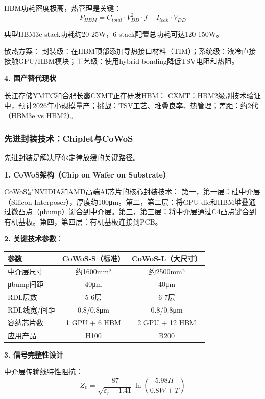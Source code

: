 HBM功耗密度极高，热管理是关键：
\begin{equation}
P_{HBM} = C_{total} \cdot V_{DD}^2 \cdot f + I_{leak} \cdot V_{DD}
\end{equation}

典型HBM3e stack功耗约20-25W，6-stack配置总功耗可达120-150W。

散热方案：
封装级：在HBM顶部添加导热接口材料（TIM）；系统级：液冷直接接触GPU/HBM模块；工艺级：使用hybrid bonding降低TSV电阻和热阻。

\textbf{4. 国产替代现状}

长江存储YMTC和合肥长鑫CXMT正在研发HBM：
CXMT：HBM2级别技术验证中，预计2026年小规模量产；挑战：TSV工艺、堆叠良率、热管理；差距：约2代（HBM3e vs HBM2）。

\subsubsection{先进封装技术：Chiplet与CoWoS}

先进封装是解决摩尔定律放缓的关键路径\cite{TSMC2024CoWoS, Intel2024EMIB, AMD2024Chiplet}。

\textbf{1. CoWoS架构（Chip on Wafer on Substrate）}

CoWoS是NVIDIA和AMD高端AI芯片的核心封装技术：
第一，第一层：硅中介层（Silicon Interposer），厚度约100μm。第二，第二层：将GPU die和HBM堆叠通过微凸点（μbump）键合到中介层。第三，第三层：将中介层通过C4凸点键合到有机基板。第四，第四层：有机基板连接到PCB。

\textbf{2. 关键技术参数}：

\begin{table}[H]
\centering
\small
\begin{tabular}{lcc}
\toprule
\textbf{参数} & \textbf{CoWoS-S（标准）} & \textbf{CoWoS-L（大尺寸）} \\
\midrule
中介层尺寸 & 约1600mm² & 约2500mm² \\
μbump间距 & 40μm & 40μm \\
RDL层数 & 5-6层 & 6-7层 \\
RDL线宽/间距 & 0.8/0.8μm & 0.8/0.8μm \\
容纳芯片数 & 1 GPU + 6 HBM & 2 GPU + 12 HBM \\
应用产品 & H100 & B200 \\
\bottomrule
\end{tabular}
\end{table}

\textbf{3. 信号完整性设计}

中介层传输线特性阻抗：
\begin{equation}
Z_0 = \frac{87}{\sqrt{\varepsilon_r + 1.41}} \ln\left(\frac{5.98H}{0.8W + T}\right)
\end{equation}

